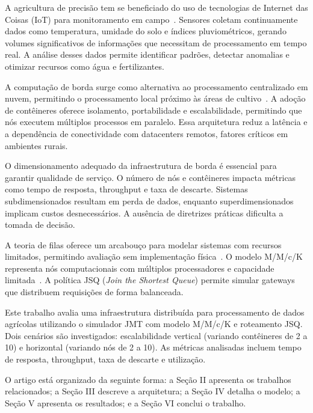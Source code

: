\documentclass[conference]{IEEEtran}
\begin{document}
A agricultura de precisão tem se beneficiado do uso de tecnologias de Internet das Coisas (IoT) para monitoramento em campo~\cite{junaidi2025deep}. Sensores coletam continuamente dados como temperatura, umidade do solo e índices pluviométricos, gerando volumes significativos de informações que necessitam de processamento em tempo real. A análise desses dados permite identificar padrões, detectar anomalias e otimizar recursos como água e fertilizantes.

A computação de borda surge como alternativa ao processamento centralizado em nuvem, permitindo o processamento local próximo às áreas de cultivo~\cite{zhang2025edge, gong2025edge}. A adoção de contêineres oferece isolamento, portabilidade e escalabilidade, permitindo que nós executem múltiplos processos em paralelo. Essa arquitetura reduz a latência e a dependência de conectividade com datacenters remotos, fatores críticos em ambientes rurais.

O dimensionamento adequado da infraestrutura de borda é essencial para garantir qualidade de serviço. O número de nós e contêineres impacta métricas como tempo de resposta, throughput e taxa de descarte. Sistemas subdimensionados resultam em perda de dados, enquanto superdimensionados implicam custos desnecessários. A ausência de diretrizes práticas dificulta a tomada de decisão.

A teoria de filas oferece um arcabouço para modelar sistemas com recursos limitados, permitindo avaliação sem implementação física~\cite{santos2021iot, rocha2025enhancing}. O modelo M/M/c/K representa nós computacionais com múltiplos processadores e capacidade limitada~\cite{li2025modeling}. A política JSQ (\textit{Join the Shortest Queue}) permite simular gateways que distribuem requisições de forma balanceada.

Este trabalho avalia uma infraestrutura distribuída para processamento de dados agrícolas utilizando o simulador JMT com modelo M/M/c/K e roteamento JSQ. Dois cenários são investigados: escalabilidade vertical (variando contêineres de 2 a 10) e horizontal (variando nós de 2 a 10). As métricas analisadas incluem tempo de resposta, throughput, taxa de descarte e utilização.

O artigo está organizado da seguinte forma: a Seção II apresenta os trabalhos relacionados; a Seção III descreve a arquitetura; a Seção IV detalha o modelo; a Seção V apresenta os resultados; e a Seção VI conclui o trabalho.
\end{document}

